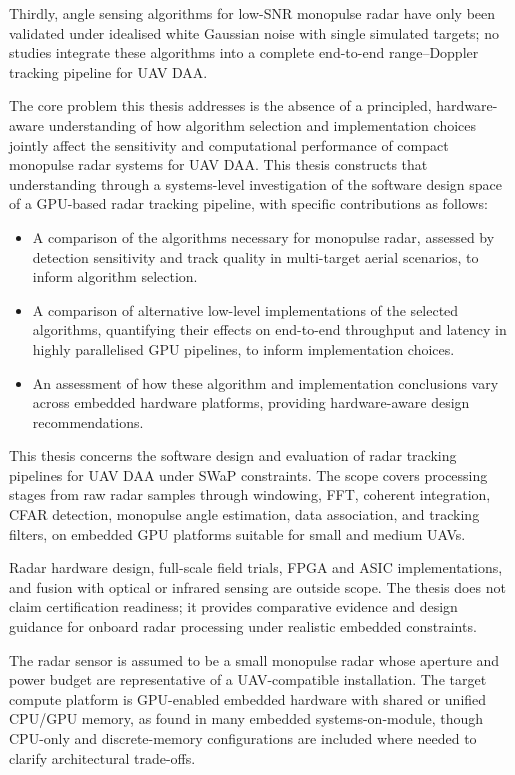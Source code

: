Thirdly, angle sensing algorithms for low-SNR monopulse radar have only been 
validated under idealised white Gaussian noise with single simulated targets; 
no studies integrate these algorithms into a complete end-to-end range--Doppler 
tracking pipeline for UAV DAA. 

The core problem this thesis addresses is the absence of a principled, 
hardware-aware understanding of how algorithm selection and implementation 
choices jointly affect the sensitivity and computational performance of compact 
monopulse radar systems for UAV DAA. This thesis constructs that understanding 
through a systems-level investigation of the software design space of a 
GPU-based radar tracking pipeline, with specific contributions as follows:

\begin{itemize}
    \item A comparison of the algorithms necessary for monopulse radar, 
    assessed by detection sensitivity and track quality 
    in multi-target aerial scenarios, to inform algorithm selection.
    \item A comparison of alternative low-level implementations of the selected 
    algorithms, quantifying their effects on end-to-end throughput and latency 
    in highly parallelised GPU pipelines, to inform implementation choices.
    \item An assessment of how these algorithm and implementation conclusions 
    vary across embedded hardware platforms, providing hardware-aware 
    design recommendations.
\end{itemize}

This thesis concerns the software design and evaluation of radar tracking pipelines for UAV 
DAA under SWaP constraints. The scope covers processing stages from raw radar samples through
windowing, FFT, coherent integration, CFAR detection, monopulse angle estimation, data 
association, and tracking filters, on embedded GPU platforms suitable for small and medium UAVs.

Radar hardware design, full-scale field trials, FPGA and ASIC implementations, and fusion  
with optical or infrared sensing are outside scope. The thesis does not claim certification 
readiness; it provides comparative evidence and design guidance for onboard radar processing 
under realistic embedded constraints.

The radar sensor is assumed to be a small monopulse radar whose aperture and power budget are 
representative of a UAV-compatible installation. The target compute platform is GPU-enabled 
embedded hardware with shared or unified CPU/GPU memory, as found in many embedded systems-on-module, 
though CPU-only and discrete-memory configurations are included where needed to clarify architectural 
trade-offs.

